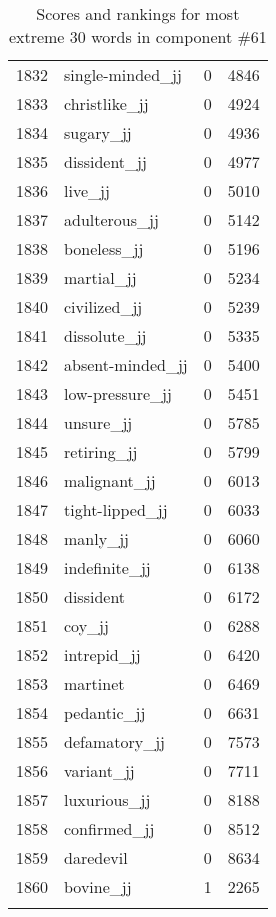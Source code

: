\begin{longtable}[!htbp]{| rlr@{.}l |}
    1832 & single-minded\_jj & 0 & 4846 \\
    1833 & christlike\_jj & 0 & 4924 \\
    1834 & sugary\_jj & 0 & 4936 \\
    1835 & dissident\_jj & 0 & 4977 \\
    1836 & live\_jj & 0 & 5010 \\
    1837 & adulterous\_jj & 0 & 5142 \\
    1838 & boneless\_jj & 0 & 5196 \\
    1839 & martial\_jj & 0 & 5234 \\
    1840 & civilized\_jj & 0 & 5239 \\
    1841 & dissolute\_jj & 0 & 5335 \\
    1842 & absent-minded\_jj & 0 & 5400 \\
    1843 & low-pressure\_jj & 0 & 5451 \\
    1844 & unsure\_jj & 0 & 5785 \\
    1845 & retiring\_jj & 0 & 5799 \\
    1846 & malignant\_jj & 0 & 6013 \\
    1847 & tight-lipped\_jj & 0 & 6033 \\
    1848 & manly\_jj & 0 & 6060 \\
    1849 & indefinite\_jj & 0 & 6138 \\
    1850 & dissident & 0 & 6172 \\
    1851 & coy\_jj & 0 & 6288 \\
    1852 & intrepid\_jj & 0 & 6420 \\
    1853 & martinet & 0 & 6469 \\
    1854 & pedantic\_jj & 0 & 6631 \\
    1855 & defamatory\_jj & 0 & 7573 \\
    1856 & variant\_jj & 0 & 7711 \\
    1857 & luxurious\_jj & 0 & 8188 \\
    1858 & confirmed\_jj & 0 & 8512 \\
    1859 & daredevil & 0 & 8634 \\
    1860 & bovine\_jj & 1 & 2265 \\
    \hline
    \caption{Scores and rankings for most extreme 30 words in component \#61} \\
\end{longtable}
